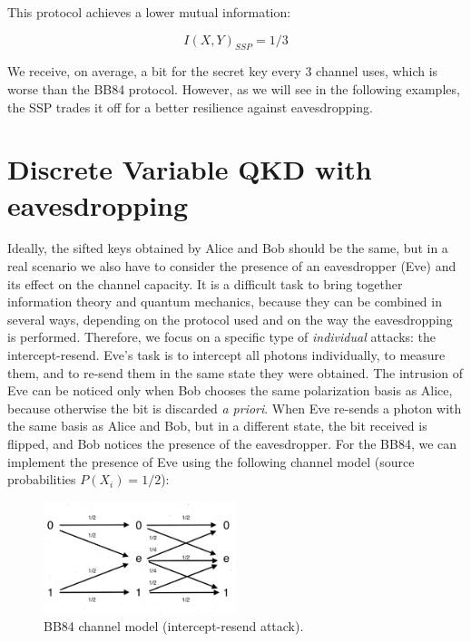 \documentclass[journal, letterpaper]{IEEEtran}
\begin{document}
This protocol achieves a lower mutual information: 

\[I(X,Y)_{SSP} = 1/3\]

We receive, on average, a bit for the secret key every 3 channel uses, which is worse than the BB84 protocol. However, as we will see in the following examples, the SSP trades it off for a better resilience against eavesdropping. 

\section{Discrete Variable QKD with eavesdropping}
Ideally, the sifted keys obtained by Alice and Bob should be the same, but in a real scenario we also have to consider the presence of an eavesdropper (Eve) and its effect on the channel capacity. It is a difficult task to bring together information theory and quantum mechanics, because they can be combined in several ways, depending on the protocol used and on the way the eavesdropping is performed. Therefore, we focus on a specific type of \textit{individual} attacks: the intercept-resend. 
Eve's task is to intercept all photons individually, to measure them, and to re-send them in the same state they were obtained. The intrusion of Eve can be noticed only when Bob chooses the same polarization basis as Alice, because otherwise the bit is discarded \textit{a priori}. When Eve re-sends a photon with the same basis as Alice and Bob, but in a different state, the bit received is flipped, and Bob notices the presence of the eavesdropper. For the BB84, we can implement the presence of Eve using the following channel model (source probabilities $P(X_i) = 1/2$): 


\begin{figure}[!h]
    \centering
    \includegraphics[width=0.5\textwidth]{Images/bb84_eve.jpg}
        \caption{BB84 channel model (intercept-resend attack).}
     \label{fig:quadtree}
\end{figure} 
\end{document}
